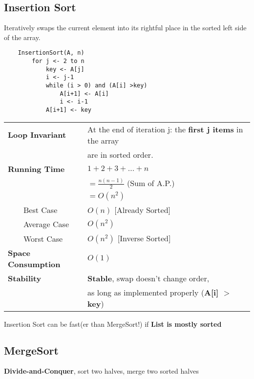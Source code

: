 \documentclass{article}
\newcommand{\tabitem}{~~\llap{\textbullet}~~}
\begin{document}
    \pagebreak

    \subsection{Insertion Sort}

    Iteratively swaps the current element into its rightful place in the sorted left side of the array.

    \begin{verbatim}
    InsertionSort(A, n)
        for j <- 2 to n
            key <- A[j]
            i <- j-1
            while (i > 0) and (A[i] >key)
                A[i+1] <- A[i]
                i <- i-1
            A[i+1] <- key
    \end{verbatim}
    
    \begin{tabular}{ll}
        \toprule
        \textbf{Loop Invariant} & At the end of iteration j: the \textbf{first j items} in the array \\
        &  are in sorted order.\\
        \midrule
        \textbf{Running Time} & $1 + 2 + 3 + ... + n$\\
        & $ = \frac{n(n-1)}{2}$ (Sum of A.P.)\\
        & $ = O(n^{2})$\\
        \tabitem Best Case & $O(n)$ [Already Sorted]\\
        \tabitem Average Case & $O(n^{2})$\\
        \tabitem Worst Case & $O(n^{2})$ [Inverse Sorted]\\
        \midrule
        \textbf{Space Consumption} & $O(1)$\\
        \midrule
        \textbf{Stability} & \textbf{Stable}, swap doesn't change order, \\
        & as long as implemented properly (\textbf{A[i] $>$ key})\\
        \bottomrule
    \end{tabular}

    \bigskip

    Insertion Sort can be fast(er than MergeSort!) if \textbf{List is mostly sorted}


    \subsection{MergeSort}

    \textbf{Divide-and-Conquer}, sort two halves, merge two sorted halves
\end{document}
